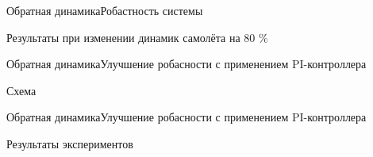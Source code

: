 \begin{frame}{Обратная динамика}{Робастность системы}
    \begin{block}{Результаты при изменении динамик самолёта на 80 \%}
    \end{block}
\end{frame}

\begin{frame}{Обратная динамика}{Улучшение робасности с применением PI-контроллера}
    \begin{block}{Схема}
    \end{block}
\end{frame}

\begin{frame}{Обратная динамика}{Улучшение робасности с применением PI-контроллера}
    \begin{block}{Результаты экспериментов}
    \end{block}
\end{frame}


